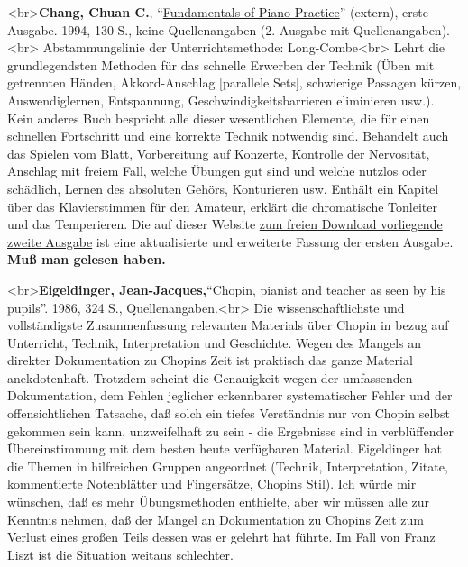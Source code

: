 \label{Chang}

<br>\textbf{Chang, Chuan C.}, \enquote{\hyperref[http://www.pianopractice.org]{Fundamentals of Piano Practice}} (extern), erste Ausgabe. 1994, 130 S., keine Quellenangaben (2. Ausgabe mit Quellenangaben).<br> Abstammungslinie der Unterrichtsmethode: Long-Combe<br>
Lehrt die grundlegendsten Methoden für das schnelle Erwerben der Technik (Üben mit getrennten Händen, Akkord-Anschlag [parallele Sets], schwierige Passagen kürzen, Auswendiglernen, Entspannung, Geschwindigkeitsbarrieren eliminieren usw.).
Kein anderes Buch bespricht alle dieser wesentlichen Elemente, die für einen schnellen Fortschritt und eine korrekte Technik notwendig sind.
Behandelt auch das Spielen vom Blatt, Vorbereitung auf Konzerte, Kontrolle der Nervosität, Anschlag mit freiem Fall, welche Übungen gut sind und welche nutzlos oder schädlich, Lernen des absoluten Gehörs, Konturieren usw.
Enthält ein Kapitel über das Klavierstimmen für den Amateur, erklärt die chromatische Tonleiter und das Temperieren.
Die auf dieser Website \hyperref[Inhalt]{zum freien Download vorliegende zweite Ausgabe} ist eine aktualisierte und erweiterte Fassung der ersten Ausgabe.
\textbf{Muß man gelesen haben.}


\label{Eigeldinger}

<br>\textbf{Eigeldinger, Jean-Jacques,}\enquote{Chopin, pianist and teacher as seen by his pupils}. 1986, 324 S., Quellenangaben.<br>
Die wissenschaftlichste und vollständigste Zusammenfassung relevanten Materials über Chopin in bezug auf Unterricht, Technik, Interpretation und Geschichte.
Wegen des Mangels an direkter Dokumentation zu Chopins Zeit ist praktisch das ganze Material anekdotenhaft.
Trotzdem scheint die Genauigkeit wegen der umfassenden Dokumentation, dem Fehlen jeglicher erkennbarer systematischer Fehler und der offensichtlichen Tatsache, daß solch ein tiefes Verständnis nur von Chopin selbst gekommen sein kann, unzweifelhaft zu sein - die Ergebnisse sind in verblüffender Übereinstimmung mit dem besten heute verfügbaren Material.
Eigeldinger hat die Themen in hilfreichen Gruppen angeordnet (Technik, Interpretation, Zitate, kommentierte Notenblätter und Fingersätze, Chopins Stil).
Ich würde mir wünschen, daß es mehr Übungsmethoden enthielte, aber wir müssen alle zur Kenntnis nehmen, daß der Mangel an Dokumentation zu Chopins Zeit zum Verlust eines großen Teils dessen was er gelehrt hat führte.
Im Fall von Franz Liszt ist die Situation weitaus schlechter.

